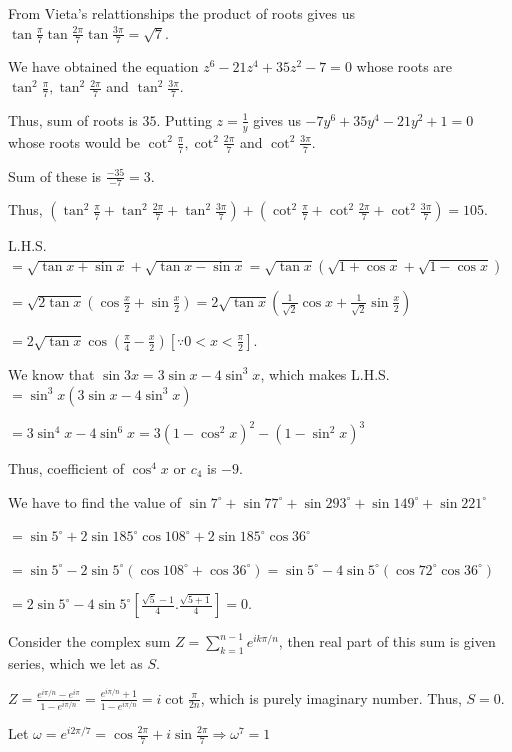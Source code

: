   From Vieta's relattionships the product of roots gives us
  $\tan\frac{\pi}{7}\tan\frac{2\pi}{7}\tan\frac{3\pi}{7} = \sqrt{7}$.
\item We have obtained the equation $z^6 - 21z^4 + 35z^2 - 7 = 0$ whose roots are
  $\tan^2\frac{\pi}{7}, \tan^2\frac{2\pi}{7}$ and $\tan^2\frac{3\pi}{7}$.

  Thus, sum of roots is $35$. Putting $z = \frac{1}{y}$ gives us $-7y^6 + 35y^4 - 21y^2 + 1 = 0$ whose roots
  would be $\cot^2\frac{\pi}{7}, \cot^2\frac{2\pi}{7}$ and $\cot^2\frac{3\pi}{7}$.

  Sum of these is $\frac{-35}{-7} = 3$.

  Thus, $\left(\tan^2\frac{\pi}{7} + \tan^2\frac{2\pi}{7} + \tan^2\frac{3\pi}{7}\right)
  + \left(\cot^2\frac{\pi}{7} + \cot^2\frac{2\pi}{7} + \cot^2\frac{3\pi}{7}\right) = 105$.
\item L.H.S.\ $= \sqrt{\tan x + \sin x} + \sqrt{\tan x - \sin x} = \sqrt{\tan x}(\sqrt{1 + \cos x} + \sqrt{1
  - \cos x})$

  $= \sqrt{2\tan x}\left(\cos\frac{x}{2} + \sin\frac{x}{2}\right) = 2\sqrt{\tan
  x}\left(\frac{1}{\sqrt{2}}\cos x + \frac{1}{\sqrt{2}}\sin\frac{x}{2}\right)$

  $= 2\sqrt{\tan x}\cos\left(\frac{\pi}{4} - \frac{x}{2}\right)[\because 0 < x < \frac{\pi}{2}]$.
\item We know that $\sin3x = 3\sin x - 4\sin^3x$, which makes L.H.S.\ $= \sin^3x\left(3\sin x -
  4\sin^3x\right)$

  $= 3\sin^4x - 4\sin^6x = 3\left(1 - \cos^2x\right)^2 - \left(1 - \sin^2x\right)^3$

  Thus, coefficient of $\cos^4x$  or $c_4$ is $-9$.
\item We have to find the value of $\sin7^\circ + \sin77^\circ + \sin293^\circ + \sin149^\circ
  + \sin221^\circ$

  $= \sin5^\circ + 2\sin185^\circ\cos108^\circ + 2\sin185^\circ\cos36^\circ$

  $= \sin5^\circ - 2\sin5^\circ\left(\cos108^\circ + \cos36^\circ\right) = \sin5^\circ -
  4\sin5^\circ\left(\cos72^\circ\cos36^\circ\right)$

  $= 2\sin5^\circ - 4\sin5^\circ\left[\frac{\sqrt{5} - 1}{4}.\frac{\sqrt{5 + 1}}{4}\right] = 0$.
\item Consider the complex sum $Z = \displaystyle\sum_{k = 1}^{n - 1}e^{ik\pi/n}$, then real part of this
  sum is given series, which we let as $S$.

  $Z = \frac{e^{i\pi/n} - e^{i\pi}}{1 - e^{i\pi/n}} = \frac{e^{i\pi/n} + 1}{1 - e^{i\pi/n}} =
  i\cot\frac{\pi}{2n}$, which is purely imaginary number. Thus, $S = 0$.
\item Let $\omega = e^{i2\pi/7} = \cos\frac{2\pi}{7} + i\sin\frac{2\pi}{7} \Rightarrow \omega^7 = 1$

